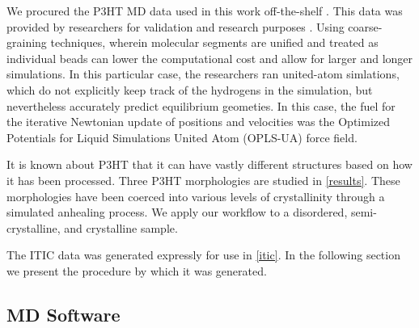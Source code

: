 We procured the P3HT MD data used in this work off-the-shelf \cite{P3HTData}. 
This data was provided by researchers for validation and research purposes \cite{Miller2018}. 
Using coarse-graining techniques, wherein molecular segments are unified and treated as individual beads can lower the computational cost and allow for larger and longer simulations. 
In this particular case, the researchers ran united-atom simlations, which do
not explicitly keep track of the hydrogens in the simulation, but nevertheless accurately predict equilibrium geometies. 
In this case, the fuel for the iterative Newtonian update of positions and velocities was the Optimized Potentials for Liquid Simulations United Atom (OPLS-UA) force field.

It is known about P3HT that it can have vastly different structures based on how it has been processed. 
Three P3HT morphologies are studied in \autoref{results}. These morphologies have been coerced into various levels of crystallinity through a simulated anhealing process. We apply our workflow to a disordered, semi-crystalline, and crystalline sample.

The ITIC data was generated expressly for use in \autoref{itic}. In the following section we present the
procedure by which it was generated. 

\subsection{MD Software}
\label{planckton}


